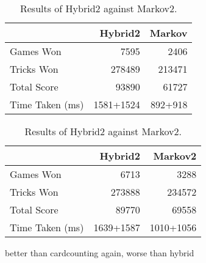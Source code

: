 \begin{table}[ht]
    \begin{minipage}{.5\linewidth}
        \centering
        \begin{tabular}{l|rr}
            ~               &  Hybrid2 &   Markov  \\  \hline
            Games Won       &   7595        &   2406   \\
            Tricks Won      &   278489      &   213471 \\
            Total Score     &   93890      &   61727  \\
            Time Taken (ms) &   1581+1524   &   892+918
        \end{tabular}
        \caption{Results of Hybrid2 against ~~ Markov.}
        \label{tab:hybrid2_markov}
    \end{minipage}%
    \begin{minipage}{.5\linewidth}
        \centering
        \begin{tabular}{l|rr}
            ~               &  Hybrid2 &   Markov2  \\  \hline
            Games Won       &   6713        &   3288   \\
            Tricks Won      &   273888      &   234572 \\
            Total Score     &   89770      &   69558  \\
            Time Taken (ms) &   1639+1587   &   1010+1056
        \end{tabular}
        \caption{Results of Hybrid2 against Markov2.}
        \label{tab:hybrid2_markov2}
    \end{minipage} 
\end{table}



better than cardcounting again, worse than hybrid

